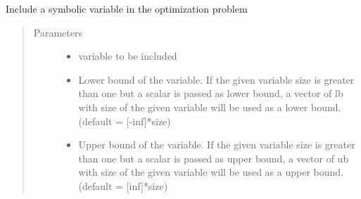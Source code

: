 \documentclass[letterpaper,10pt,english]{sphinxmanual}
\begin{document}
\begin{fulllineitems}
\begin{fulllineitems}
\label{\detokenize{yaocptool.optimization:yaocptool.optimization.abstract_optimization_problem.AbstractOptimizationProblem.include_parameter}}
\end{fulllineitems}


\begin{fulllineitems}
\label{\detokenize{yaocptool.optimization:yaocptool.optimization.abstract_optimization_problem.AbstractOptimizationProblem.include_variable}}
Include a symbolic variable in the optimization problem
\begin{quote}\begin{description}
\item[{Parameters}] \leavevmode\begin{itemize}
\item {} 
 \textendash{} variable to be included

\item {} 
 \textendash{} Lower bound of the variable. If the given variable size is greater than one but a scalar is passed as
lower bound, a vector of lb with size of the given variable will be used as a lower bound.
(default = {[}-inf{]}*size)

\item {} 
 \textendash{} Upper bound of the variable. If the given variable size is greater than one but a scalar is passed as
upper bound, a vector of ub  with size of the given variable will be used as a upper bound.
(default = {[}inf{]}*size)

\end{itemize}

\end{description}\end{quote}

\end{fulllineitems}



\end{fulllineitems}
\end{document}
